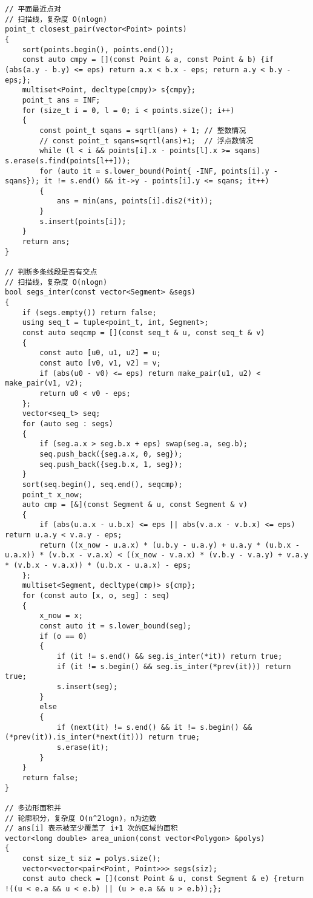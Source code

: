 \documentclass[a4paper,10pt]{article}
\begin{document}
\begin{lstlisting}
// 平面最近点对
// 扫描线，复杂度 O(nlogn)
point_t closest_pair(vector<Point> points)
{
    sort(points.begin(), points.end());
    const auto cmpy = [](const Point & a, const Point & b) {if (abs(a.y - b.y) <= eps) return a.x < b.x - eps; return a.y < b.y - eps;};
    multiset<Point, decltype(cmpy)> s{cmpy};
    point_t ans = INF;
    for (size_t i = 0, l = 0; i < points.size(); i++)
    {
        const point_t sqans = sqrtl(ans) + 1; // 整数情况
        // const point_t sqans=sqrtl(ans)+1;  // 浮点数情况
        while (l < i && points[i].x - points[l].x >= sqans) s.erase(s.find(points[l++]));
        for (auto it = s.lower_bound(Point{ -INF, points[i].y - sqans}); it != s.end() && it->y - points[i].y <= sqans; it++)
        {
            ans = min(ans, points[i].dis2(*it));
        }
        s.insert(points[i]);
    }
    return ans;
}

// 判断多条线段是否有交点
// 扫描线，复杂度 O(nlogn)
bool segs_inter(const vector<Segment> &segs)
{
    if (segs.empty()) return false;
    using seq_t = tuple<point_t, int, Segment>;
    const auto seqcmp = [](const seq_t & u, const seq_t & v)
    {
        const auto [u0, u1, u2] = u;
        const auto [v0, v1, v2] = v;
        if (abs(u0 - v0) <= eps) return make_pair(u1, u2) < make_pair(v1, v2);
        return u0 < v0 - eps;
    };
    vector<seq_t> seq;
    for (auto seg : segs)
    {
        if (seg.a.x > seg.b.x + eps) swap(seg.a, seg.b);
        seq.push_back({seg.a.x, 0, seg});
        seq.push_back({seg.b.x, 1, seg});
    }
    sort(seq.begin(), seq.end(), seqcmp);
    point_t x_now;
    auto cmp = [&](const Segment & u, const Segment & v)
    {
        if (abs(u.a.x - u.b.x) <= eps || abs(v.a.x - v.b.x) <= eps) return u.a.y < v.a.y - eps;
        return ((x_now - u.a.x) * (u.b.y - u.a.y) + u.a.y * (u.b.x - u.a.x)) * (v.b.x - v.a.x) < ((x_now - v.a.x) * (v.b.y - v.a.y) + v.a.y * (v.b.x - v.a.x)) * (u.b.x - u.a.x) - eps;
    };
    multiset<Segment, decltype(cmp)> s{cmp};
    for (const auto [x, o, seg] : seq)
    {
        x_now = x;
        const auto it = s.lower_bound(seg);
        if (o == 0)
        {
            if (it != s.end() && seg.is_inter(*it)) return true;
            if (it != s.begin() && seg.is_inter(*prev(it))) return true;
            s.insert(seg);
        }
        else
        {
            if (next(it) != s.end() && it != s.begin() && (*prev(it)).is_inter(*next(it))) return true;
            s.erase(it);
        }
    }
    return false;
}

// 多边形面积并
// 轮廓积分，复杂度 O(n^2logn)，n为边数
// ans[i] 表示被至少覆盖了 i+1 次的区域的面积
vector<long double> area_union(const vector<Polygon> &polys)
{
    const size_t siz = polys.size();
    vector<vector<pair<Point, Point>>> segs(siz);
    const auto check = [](const Point & u, const Segment & e) {return !((u < e.a && u < e.b) || (u > e.a && u > e.b));};


\end{lstlisting}
\end{document}
